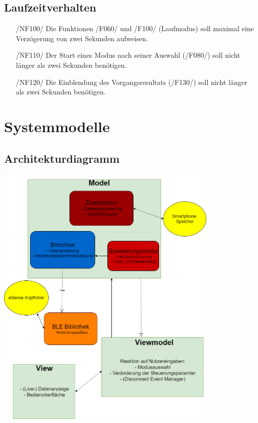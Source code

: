 \documentclass[a4paper,12pt]{article}
\begin{document}
\subsection{Laufzeitverhalten}
\begin{itemize}
  \item[/NF100/] Die Funktionen /F060/ und /F100/ (Laufmodus) soll maximal eine Verzögerung von zwei Sekunden aufweisen. %
  \item[/NF110/] Der Start eines Modus nach seiner Auswahl (/F080/) soll nicht länger als zwei Sekunden benötigen. %
  \item[/NF120/] Die Einblendung des Vorgangsresultats (/F130/) soll nicht länger als zwei Sekunden benötigen.%

\end{itemize}
\section{Systemmodelle}
  \subsection{Architekturdiagramm}
  \begin{center}
  	\vspace{100px}
  	\includegraphics[width=0.8\textwidth]{./Diagramme/Archi3.png}
  \end{center}
  
\end{document}
